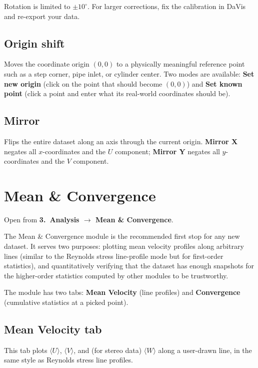 \documentclass[11pt, a4paper]{report}
\newcommand{\uipth}[1]{\textbf{\textcolor{upblue}{#1}}}
\begin{document}
\begin{notebox}
Rotation is limited to $\pm10^\circ$. For larger corrections, fix the calibration in DaVis and re-export your data.
\end{notebox}

\section{Origin shift}

Moves the coordinate origin $(0, 0)$ to a physically meaningful reference point such as a step corner, pipe inlet, or cylinder center. Two modes are available: \uipth{Set new origin} (click on the point that should become $(0, 0)$) and \uipth{Set known point} (click a point and enter what its real-world coordinates should be).

\section{Mirror}

Flips the entire dataset along an axis through the current origin. \uipth{Mirror X} negates all $x$-coordinates and the $U$ component; \uipth{Mirror Y} negates all $y$-coordinates and the $V$ component.

\chapter{Mean \& Convergence}
\label{ch:meanconv}

Open from \uipth{3.\ Analysis $\to$ Mean \& Convergence}.

The Mean \& Convergence module is the recommended first stop for any new dataset. It serves two purposes: plotting mean velocity profiles along arbitrary lines (similar to the Reynolds stress line-profile mode but for first-order statistics), and quantitatively verifying that the dataset has enough snapshots for the higher-order statistics computed by other modules to be trustworthy.

The module has two tabs: \uipth{Mean Velocity} (line profiles) and \uipth{Convergence} (cumulative statistics at a picked point).

\section{Mean Velocity tab}
\label{sec:meanvel}

This tab plots $\langle U \rangle$, $\langle V \rangle$, and (for stereo data) $\langle W \rangle$ along a user-drawn line, in the same style as Reynolds stress line profiles.
\end{document}

